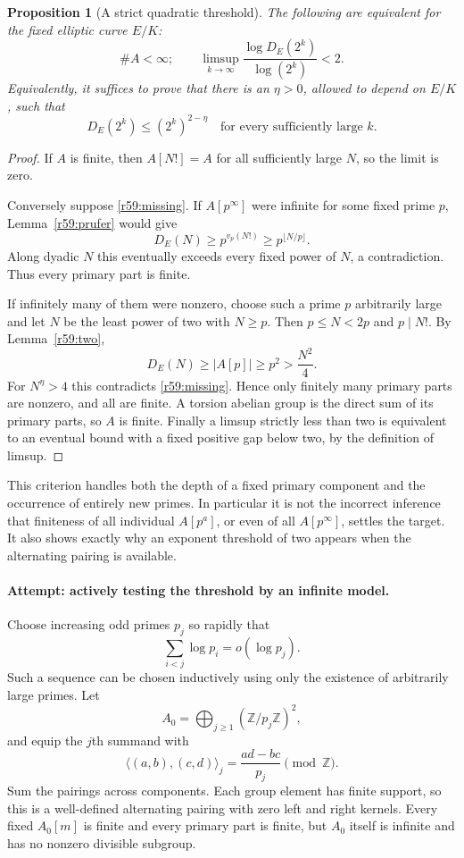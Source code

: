 \documentclass[11pt,a4paper]{article}
\newcommand{\Z}{\mathbb{Z}}
\newtheorem{notebookproposition}[notebooklemma]{Proposition}
\numberwithin{equation}{section}
\begin{document}
\begin{notebookproposition}[A strict quadratic threshold]\label{r59:threshold}
The following are equivalent for the fixed elliptic curve $E/K$:
\[
 \#A<\infty;
 \qquad
 \limsup_{k\to\infty}
   \frac{\log D_E(2^k)}{\log(2^k)}<2.
\]
Equivalently, it suffices to prove that there is an $\eta>0$, allowed to depend on $E/K$, such that
\begin{equation}\label{r59:missing}
 D_E(2^k)\leq(2^k)^{2-\eta}
                   \quad\text{for every sufficiently large }k.
\end{equation}
\end{notebookproposition}
\begin{proof}
If $A$ is finite, then $A[N!]=A$ for all sufficiently large $N$, so the limit is zero.

Conversely suppose \eqref{r59:missing}. If $A[p^\infty]$ were infinite for some fixed prime $p$, Lemma~\ref{r59:prufer} would give
\[
 D_E(N)\geq p^{v_p(N!)}\geq p^{\lfloor N/p\rfloor}.
\]
Along dyadic $N$ this eventually exceeds every fixed power of $N$, a contradiction. Thus every primary part is finite.

If infinitely many of them were nonzero, choose such a prime $p$ arbitrarily large and let $N$ be the least power of two with $N\geq p$. Then $p\leq N<2p$ and $p\mid N!$. By Lemma~\ref{r59:two},
\[
 D_E(N)\geq|A[p]|\geq p^2>\frac{N^2}{4}.
\]
For $N^\eta>4$ this contradicts \eqref{r59:missing}. Hence only finitely many primary parts are nonzero, and all are finite. A torsion abelian group is the direct sum of its primary parts, so $A$ is finite. Finally a limsup strictly less than two is equivalent to an eventual bound with a fixed positive gap below two, by the definition of limsup.
\end{proof}

This criterion handles both the depth of a fixed primary component and the occurrence of entirely new primes. In particular it is not the incorrect inference that finiteness of all individual $A[p^a]$, or even of all $A[p^\infty]$, settles the target. It also shows exactly why an exponent threshold of two appears when the alternating pairing is available.

\paragraph{Attempt: actively testing the threshold by an infinite model.}
Choose increasing odd primes $p_j$ so rapidly that
\begin{equation}\label{r59:lacunary}
 \sum_{i<j}\log p_i=o(\log p_j).
\end{equation}
Such a sequence can be chosen inductively using only the existence of arbitrarily large primes. Let
\[
 A_0=\bigoplus_{j\geq1}(\Z/p_j\Z)^2,
\]
and equip the $j$th summand with
\[
 \langle(a,b),(c,d)\rangle_j=\frac{ad-bc}{p_j}\pmod\Z.
\]
Sum the pairings across components. Each group element has finite support, so this is a well-defined alternating pairing with zero left and right kernels. Every fixed $A_0[m]$ is finite and every primary part is finite, but $A_0$ itself is infinite and has no nonzero divisible subgroup.
\end{document}
